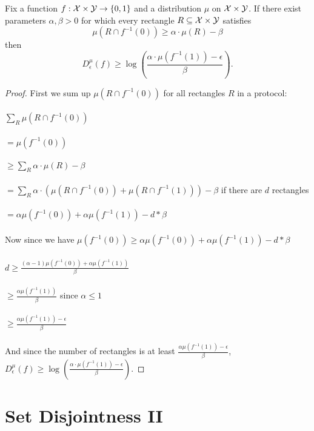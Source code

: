 \begin{lemma}
	Fix a function $f : \mathcal{X} \times \mathcal{Y} \to \{0,1\}$ and a distribution
	$\mu$ on $\mathcal{X} \times \mathcal{Y}$.
	If there exist parameters $\alpha, \beta > 0$ for which
	every rectangle $R \subseteq \mathcal{X} \times \mathcal{Y}$ satisfies 
	\[
	\mu(R \cap f^{-1}(0)) \ge \alpha \cdot \mu(R) - \beta
	\]
	then
	\[
	D^\mu_\epsilon(f) \ge \log\left( \frac{\alpha \cdot \mu(f^{-1}(1)) - \epsilon}{\beta}\right).
	\]
\end{lemma}

\begin{proof}
	First we sum up $\mu(R \cap f^{-1}(0))$ for all rectangles $R$ in a protocol:\\
	\\
	$\sum_R\mu(R \cap f^{-1}(0))$\\
	\\
	$= \mu(f^{-1}(0))$\\
	\\
	$\ge \sum_R \alpha \cdot \mu(R) - \beta$\\
	\\
	$= \sum_R \alpha \cdot (\mu(R \cap f^{-1}(0))+\mu(R \cap f^{-1}(1))) - \beta $ if there are $d$ rectangles\\
	\\
	$= \alpha \mu(f^{-1}(0))+\alpha \mu(f^{-1}(1)) - d*\beta$\\
	\\
	Now since we have $\mu(f^{-1}(0)) \ge \alpha \mu(f^{-1}(0))+\alpha \mu(f^{-1}(1)) - d*\beta$ \\
	\\
	$d \ge \frac{(\alpha-1) \mu(f^{-1}(0))+\alpha \mu(f^{-1}(1))}{\beta}$\\
	\\
	$\ge \frac{\alpha \mu(f^{-1}(1))}{\beta}$ since $\alpha \leq 1$ \\
	\\
	$\ge \frac{\alpha \mu(f^{-1}(1))-\epsilon}{\beta}$\\
	\\
	And since the number of rectangles is at least $\frac{\alpha \mu(f^{-1}(1))-\epsilon}{\beta}$, $D^\mu_\epsilon(f) \ge \log\left( \frac{\alpha \cdot \mu(f^{-1}(1)) - \epsilon}{\beta}\right)$.
\end{proof}



\section{Set Disjointness II}


